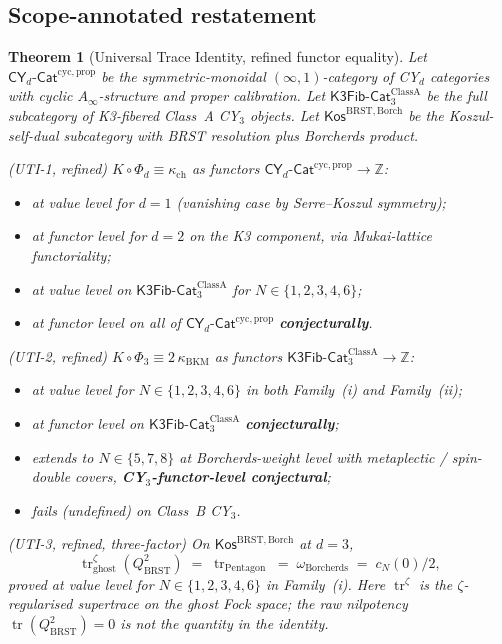 \documentclass[11pt]{article}
\newtheorem{theorem}{Theorem}
\theoremstyle{definition}
\newcommand{\kch}{\kappa_{\mathrm{ch}}}
\newcommand{\kBKM}{\kappa_{\mathrm{BKM}}}
\newcommand{\BRST}{\mathrm{BRST}}
\newcommand{\tr}{\operatorname{tr}}
\begin{document}
\subsection{Scope-annotated restatement}

\begin{theorem}[Universal Trace Identity, refined functor equality]
\label{thm:uti-refined}
Let $\mathsf{CY}_d\text{-}\mathsf{Cat}^{\mathrm{cyc},\mathrm{prop}}$ be
the symmetric-monoidal $(\infty, 1)$-category of CY$_d$ categories with
cyclic $A_\infty$-structure and proper calibration. Let
$\mathsf{K3Fib}\text{-}\mathsf{Cat}_3^{\mathrm{Class A}}$ be the
full subcategory of K3-fibered Class~A CY$_3$ objects. Let
$\mathsf{Kos}^{\BRST,\mathrm{Borch}}$ be the Koszul-self-dual subcategory
with BRST resolution plus Borcherds product.

\textup{(UTI-1, refined)}\quad
$K \circ \Phi_d \equiv \kch$ as functors
$\mathsf{CY}_d\text{-}\mathsf{Cat}^{\mathrm{cyc},\mathrm{prop}}
\to \mathbb{Z}$:
\begin{itemize}
\item at value level for $d = 1$ (vanishing case by Serre--Koszul symmetry);
\item at functor level for $d = 2$ on the K3 component, via Mukai-lattice
functoriality;
\item at value level on $\mathsf{K3Fib}\text{-}\mathsf{Cat}_3^{\mathrm{Class A}}$
for $N \in \{1, 2, 3, 4, 6\}$;
\item at functor level on all of $\mathsf{CY}_d\text{-}\mathsf{Cat}^{\mathrm{cyc},\mathrm{prop}}$
\textbf{conjecturally}.
\end{itemize}

\textup{(UTI-2, refined)}\quad
$K \circ \Phi_3 \equiv 2\,\kBKM$ as functors
$\mathsf{K3Fib}\text{-}\mathsf{Cat}_3^{\mathrm{Class A}}
\to \mathbb{Z}$:
\begin{itemize}
\item at value level for $N \in \{1, 2, 3, 4, 6\}$ in both Family~(i)
and Family~(ii);
\item at functor level on $\mathsf{K3Fib}\text{-}\mathsf{Cat}_3^{\mathrm{Class A}}$
\textbf{conjecturally};
\item extends to $N \in \{5, 7, 8\}$ at Borcherds-weight level with
metaplectic / spin-double covers, \textbf{CY$_3$-functor-level conjectural};
\item fails (undefined) on Class~B CY$_3$.
\end{itemize}

\textup{(UTI-3, refined, three-factor)}\quad
On $\mathsf{Kos}^{\BRST,\mathrm{Borch}}$ at $d = 3$,
\begin{equation}
\label{eq:three-factor-refined}
   \tr^{\zeta}_{\mathrm{ghost}}(Q_{\BRST}^2)
   \;=\; \tr_{\mathrm{Pentagon}}
   \;=\; \omega_{\mathrm{Borcherds}}
   \;=\; c_N(0)/2,
\end{equation}
proved at value level for $N \in \{1, 2, 3, 4, 6\}$ in Family~(i). Here
$\tr^{\zeta}$ is the $\zeta$-regularised supertrace on the ghost Fock
space; the raw nilpotency $\tr(Q_{\BRST}^2) = 0$ is not the quantity in
the identity.
\end{theorem}
\end{document}
